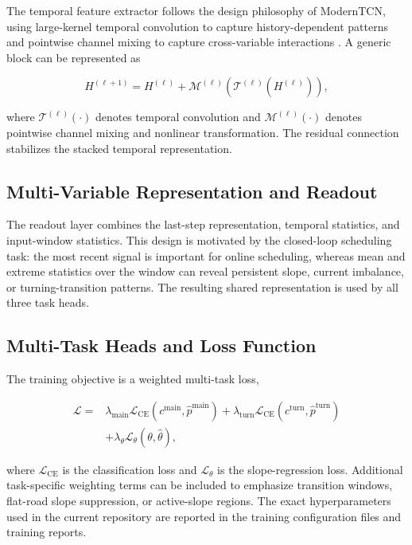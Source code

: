 \documentclass{ieeeaccess}
\begin{document}
The temporal feature extractor follows the design philosophy of ModernTCN, using large-kernel temporal convolution to capture history-dependent patterns and pointwise channel mixing to capture cross-variable interactions \cite{Luo2024ModernTCN}. A generic block can be represented as

\begin{equation}
H^{(\ell+1)} =
H^{(\ell)} +
\mathcal{M}^{(\ell)}
\left(
\mathcal{T}^{(\ell)}(H^{(\ell)})
\right),
\label{eq:modern_block}
\end{equation}

where $\mathcal{T}^{(\ell)}(\cdot)$ denotes temporal convolution and $\mathcal{M}^{(\ell)}(\cdot)$ denotes pointwise channel mixing and nonlinear transformation. The residual connection stabilizes the stacked temporal representation.

\subsection{Multi-Variable Representation and Readout}

The readout layer combines the last-step representation, temporal statistics, and input-window statistics. This design is motivated by the closed-loop scheduling task: the most recent signal is important for online scheduling, whereas mean and extreme statistics over the window can reveal persistent slope, current imbalance, or turning-transition patterns. The resulting shared representation is used by all three task heads.

\subsection{Multi-Task Heads and Loss Function}

The training objective is a weighted multi-task loss,

\begin{equation}
\begin{aligned}
\mathcal{L}
=
&\lambda_{\mathrm{main}}
\mathcal{L}_{\mathrm{CE}}
\left(
c^{\mathrm{main}},
\hat{p}^{\mathrm{main}}
\right)
+
\lambda_{\mathrm{turn}}
\mathcal{L}_{\mathrm{CE}}
\left(
c^{\mathrm{turn}},
\hat{p}^{\mathrm{turn}}
\right)\\
&+
\lambda_{\theta}
\mathcal{L}_{\theta}
\left(
\theta,
\hat{\theta}
\right),
\end{aligned}
\label{eq:multi_task_loss}
\end{equation}

where $\mathcal{L}_{\mathrm{CE}}$ is the classification loss and $\mathcal{L}_{\theta}$ is the slope-regression loss. Additional task-specific weighting terms can be included to emphasize transition windows, flat-road slope suppression, or active-slope regions. The exact hyperparameters used in the current repository are reported in the training configuration files and training reports.
\end{document}
